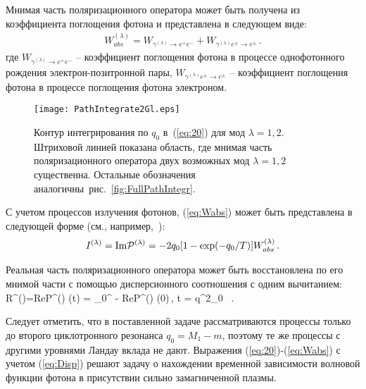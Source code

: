 Мнимая часть поляризационного оператора может быть получена из коэффициента  
поглощения фотона и представлена в следующем виде:
\begin{eqnarray}
W^{(\lambda)}_{abs} = W_{\gamma^{(\lambda)} \to e^+ e^-} + W_{\gamma^{(\lambda)} e^{\pm} \to e^{\pm}} \, .
\label{eq:Wabs}
\end{eqnarray}
где $W_{\gamma^{(\lambda)} \to e^+ e^-}$ -- коэффициент поглощения фотона в процессе однофотонного рождения электрон-позитронной пары, $W_{\gamma^{(\lambda)} e^{\pm} \to e^{\pm}}$ -- коэффициент поглощения фотона в процессе поглощения фотона электроном.

\begin{figure}[t]\centering
	\texttt{[image: PathIntegrate2Gl.eps]}
	\caption{Контур интегрирования по $q_0$ в~(\ref{eq:20}) для мод $\lambda = 1,2$. Штриховой линией показана область, где мнимая часть поляризационного оператора двух возможных мод $\lambda = 1,2$ существенна. Остальные обозначения аналогичны~рис.~\ref{fig:FullPathIntegr}.}\label{fig:PathIntegr}
\end{figure}

С учетом процессов излучения фотонов, (\ref{eq:Wabs}) может быть представлена в следующей форме (см., например,~\cite{Shabad:1988, Rumyantsev:2017,Weldon:1983}): 
\begin{eqnarray}\label{eq:Ilambda}
I^{(\lambda)}=\text{Im} {\cal P}^{(\lambda)} =  -2 q_0 [1-\exp (-q_0/T)] W^{(\lambda)}_{abs} \, . 
\label{eq:ImP}
\end{eqnarray}

Реальная часть 
поляризационного оператора может быть восстановлена по его мнимой части с помощью дисперсионного соотношения с одним 
вычитанием:
%
\beq 
R^{(\lambda)}=\textrm{Re}{\cal P}^{(\lambda)} (t) = \int \limits_0^\infty {} - \textrm{Re}{\cal P}^{(\lambda)} (0)\,, \qquad  t = q^2_0 \, .
\label{eq:Disp}
\eeq

Следует отметить, что в поставленной задаче рассматриваются процессы только до второго циклотронного резонанса $q_0=M_1-m$, поэтому те же процессы с другими уровнями Ландау вклада не дают.
Выражения (\ref{eq:20})-(\ref{eq:Wabs}) с учетом (\ref{eq:Disp}) решают задачу 
о нахождении временной зависимости волновой функции фотона  в присутствии сильно 
замагниченной плазмы. 

